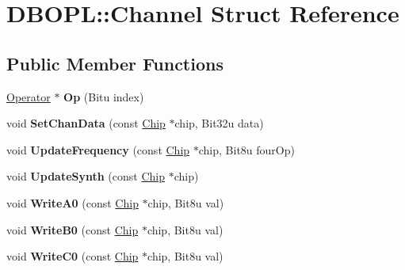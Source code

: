 \hypertarget{structDBOPL_1_1Channel}{\section{D\-B\-O\-P\-L\-:\-:Channel Struct Reference}
\label{structDBOPL_1_1Channel}
}
\subsection*{Public Member Functions}
\begin{DoxyCompactItemize}
\item 
\hypertarget{structDBOPL_1_1Channel_a54d428b50eb682592bbd51f56a62a4f9}{\hyperlink{structDBOPL_1_1Operator}{Operator} $\ast$ {\bfseries Op} (Bitu index)}\label{structDBOPL_1_1Channel_a54d428b50eb682592bbd51f56a62a4f9}

\item 
\hypertarget{structDBOPL_1_1Channel_ae6e7eafa3ea682e7e5c7f4a50f197181}{void {\bfseries Set\-Chan\-Data} (const \hyperlink{structDBOPL_1_1Chip}{Chip} $\ast$chip, Bit32u data)}\label{structDBOPL_1_1Channel_ae6e7eafa3ea682e7e5c7f4a50f197181}

\item 
\hypertarget{structDBOPL_1_1Channel_a86f42e926233a28c6bc3448e54cfd546}{void {\bfseries Update\-Frequency} (const \hyperlink{structDBOPL_1_1Chip}{Chip} $\ast$chip, Bit8u four\-Op)}\label{structDBOPL_1_1Channel_a86f42e926233a28c6bc3448e54cfd546}

\item 
\hypertarget{structDBOPL_1_1Channel_a62ce41d757e5dc1f91013e12eff83fa7}{void {\bfseries Update\-Synth} (const \hyperlink{structDBOPL_1_1Chip}{Chip} $\ast$chip)}\label{structDBOPL_1_1Channel_a62ce41d757e5dc1f91013e12eff83fa7}

\item 
\hypertarget{structDBOPL_1_1Channel_a756b7c37c2137e336260c5afeabecd49}{void {\bfseries Write\-A0} (const \hyperlink{structDBOPL_1_1Chip}{Chip} $\ast$chip, Bit8u val)}\label{structDBOPL_1_1Channel_a756b7c37c2137e336260c5afeabecd49}

\item 
\hypertarget{structDBOPL_1_1Channel_aa9153eb97e4a16d9da0169eb65b92bcb}{void {\bfseries Write\-B0} (const \hyperlink{structDBOPL_1_1Chip}{Chip} $\ast$chip, Bit8u val)}\label{structDBOPL_1_1Channel_aa9153eb97e4a16d9da0169eb65b92bcb}

\item 
\hypertarget{structDBOPL_1_1Channel_ac49656ad221520c54e6d8f477a198449}{void {\bfseries Write\-C0} (const \hyperlink{structDBOPL_1_1Chip}{Chip} $\ast$chip, Bit8u val)}\label{structDBOPL_1_1Channel_ac49656ad221520c54e6d8f477a198449}


\end{DoxyCompactItemize}
